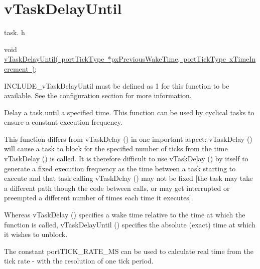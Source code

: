 \hypertarget{group__v_task_delay_until}{}\section{v\+Task\+Delay\+Until}
\label{group__v_task_delay_until}
task. h 
\begin{DoxyPre}void \mbox{\hyperlink{task_8h_a3033ef5b1abc8618ea205d1082b21bb6}{vTaskDelayUntil( portTickType *pxPreviousWakeTime, portTickType xTimeIncrement )}};\end{DoxyPre}


I\+N\+C\+L\+U\+D\+E\+\_\+v\+Task\+Delay\+Until must be defined as 1 for this function to be available. See the configuration section for more information.

Delay a task until a specified time. This function can be used by cyclical tasks to ensure a constant execution frequency.

This function differs from v\+Task\+Delay () in one important aspect\+: v\+Task\+Delay () will cause a task to block for the specified number of ticks from the time v\+Task\+Delay () is called. It is therefore difficult to use v\+Task\+Delay () by itself to generate a fixed execution frequency as the time between a task starting to execute and that task calling v\+Task\+Delay () may not be fixed \mbox{[}the task may take a different path though the code between calls, or may get interrupted or preempted a different number of times each time it executes\mbox{]}.

Whereas v\+Task\+Delay () specifies a wake time relative to the time at which the function is called, v\+Task\+Delay\+Until () specifies the absolute (exact) time at which it wishes to unblock.

The constant port\+T\+I\+C\+K\+\_\+\+R\+A\+T\+E\+\_\+\+MS can be used to calculate real time from the tick rate -\/ with the resolution of one tick period.


